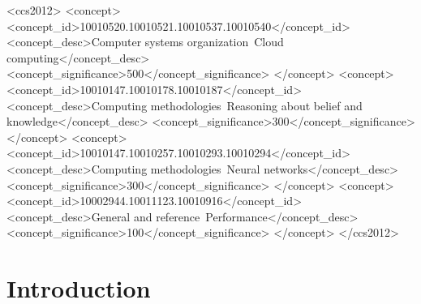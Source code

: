 \documentclass[sigconf]{acmart}
\begin{document}
\begin{CCSXML}
<ccs2012>
 <concept>
  <concept_id>10010520.10010521.10010537.10010540</concept_id>
  <concept_desc>Computer systems organization~Cloud computing</concept_desc>
  <concept_significance>500</concept_significance>
 </concept>
 <concept>
  <concept_id>10010147.10010178.10010187</concept_id>
  <concept_desc>Computing methodologies~Reasoning about belief and knowledge</concept_desc>
  <concept_significance>300</concept_significance>
 </concept>
 <concept>
  <concept_id>10010147.10010257.10010293.10010294</concept_id>
  <concept_desc>Computing methodologies~Neural networks</concept_desc>
  <concept_significance>300</concept_significance>
 </concept>
 <concept>
  <concept_id>10002944.10011123.10010916</concept_id>
  <concept_desc>General and reference~Performance</concept_desc>
  <concept_significance>100</concept_significance>
 </concept>
</ccs2012>
\end{CCSXML}



\maketitle

\section{Introduction}
\label{sec:introduction}
\end{document}
